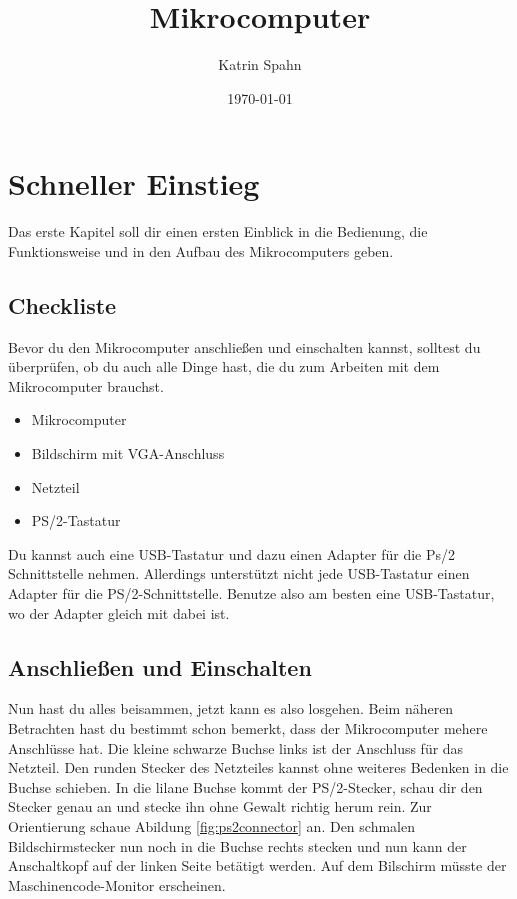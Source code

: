 \documentclass[10pt]{book}
\title{Mikrocomputer}
\author{Katrin Spahn}
\date{\today}
\begin{document}
\maketitle

\chapter{Schneller Einstieg}

Das erste Kapitel soll dir einen ersten Einblick
in die Bedienung, die Funktionsweise
und in den Aufbau des Mikrocomputers geben.

\section{Checkliste}
Bevor du den Mikrocomputer anschließen und einschalten
kannst, solltest du überprüfen, ob du auch alle Dinge
hast, die du zum Arbeiten mit dem Mikrocomputer brauchst.

\begin{itemize}
\item Mikrocomputer
\item Bildschirm mit VGA-Anschluss
\item Netzteil
\item PS/2-Tastatur 

\end{itemize}
Du kannst auch eine USB-Tastatur und dazu einen Adapter für die 
Ps/2 Schnittstelle nehmen.
Allerdings unterstützt nicht jede USB-Tastatur
einen Adapter für die PS/2-Schnittstelle.
Benutze also am besten eine USB-Tastatur,
wo der Adapter gleich mit dabei ist.


\section{Anschließen und Einschalten}
Nun hast du alles beisammen, jetzt kann es also losgehen.
Beim näheren Betrachten hast du bestimmt schon bemerkt,
dass der Mikrocomputer mehere Anschlüsse hat.
Die kleine schwarze Buchse links
ist der Anschluss für das Netzteil.
Den runden Stecker des Netzteiles kannst
ohne weiteres Bedenken in die Buchse schieben.
In die lilane Buchse kommt der PS/2-Stecker,
schau dir den Stecker genau an und stecke ihn
ohne Gewalt richtig herum rein.
Zur Orientierung schaue
Abildung \ref{fig:ps2connector} an.
Den schmalen Bildschirmstecker nun noch
in die Buchse rechts stecken
und nun kann der Anschaltkopf
auf der linken Seite betätigt werden.
Auf dem Bilschirm müsste der
Maschinencode-Monitor erscheinen.
\end{document}
